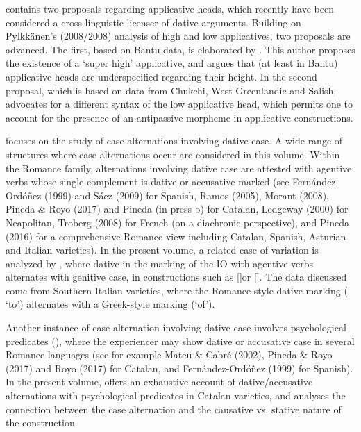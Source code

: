 \begin{styleListNumberi}
contains two proposals regarding applicative heads, which recently have been considered a cross-linguistic licenser of dative arguments. Building on Pylkkänen’s (2008/2008) analysis of high and low applicatives, two proposals are advanced. The first, based on Bantu data, is elaborated by . This author proposes the existence of a ‘super high’ applicative, and argues that (at least in Bantu) applicative heads are underspecified regarding their height. In the second proposal, which is based on data from Chukchi, West Greenlandic and Salish, advocates for a different syntax of the low applicative head, which permits one to account for the presence of an antipassive morpheme in applicative constructions. 
\end{styleListNumberi}

\begin{styleListNumberi}
 focuses on the study of case alternations involving dative case. A wide range of structures where case alternations occur are considered in this volume. Within the Romance family, alternations involving dative case are attested with agentive verbs whose single complement is dative or accusative-marked (see Fernández-Ordóñez (1999) and Sáez (2009) for Spanish, Ramos (2005), Morant (2008), Pineda \& Royo (2017) and Pineda (in press b) for Catalan, Ledgeway (2000) for Neapolitan, Troberg (2008) for French (on a diachronic perspective), and Pineda (2016) for a comprehensive Romance view including Catalan, Spanish, Asturian and Italian varieties). In the present volume, a related case of variation is analyzed by , where dative in the marking of the IO with agentive verbs alternates with genitive case, in constructions such as []or []. The data discussed come from Southern Italian varieties, where the Romance-style dative marking ( ‘to’) alternates with a Greek-style marking (‘of’). 
\end{styleListNumberi}

\begin{styleNormalWeb}
Another instance of case alternation involving dative case involves psychological predicates (), where the experiencer may show dative or accusative case in several Romance languages (see for example Mateu \& Cabré (2002), Pineda \& Royo (2017) and Royo (2017) for Catalan, and Fernández-Ordóñez (1999) for Spanish). In the present volume, offers an exhaustive account of dative/accusative alternations with psychological predicates in Catalan varieties, and analyses the connection between the case alternation and the causative vs. stative nature of the construction.
\end{styleNormalWeb}

